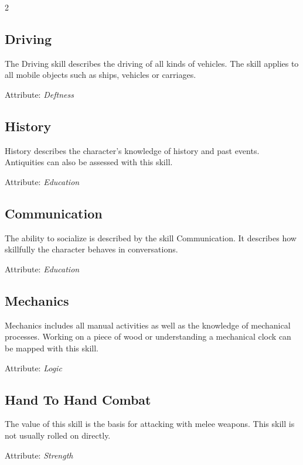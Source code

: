 \begin{multicols}{2}
\subsection{Driving}

The Driving skill describes the driving of all kinds of vehicles. The skill applies to all mobile objects such as ships, vehicles or carriages.

Attribute: \textit{Deftness}

\subsection{History}

History describes the character's knowledge of history and past events. Antiquities can also be assessed with this skill.

Attribute: \textit{Education}

\subsection{Communication}

The ability to socialize is described by the skill Communication. It describes how skillfully the character behaves in conversations.

Attribute: \textit{Education}

\subsection{Mechanics}

Mechanics includes all manual activities as well as the knowledge of mechanical processes. Working on a piece of wood or understanding a mechanical clock can be mapped with this skill.

Attribute: \textit{Logic}

\subsection{Hand To Hand Combat}

The value of this skill is the basis for attacking with melee weapons. This skill is not usually rolled on directly.

Attribute: \textit{Strength}


\end{multicols}
